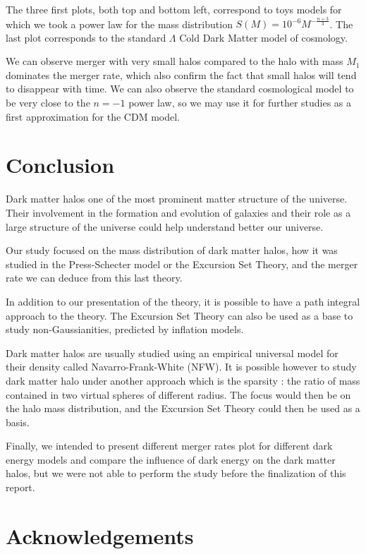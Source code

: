 The three first plots, both top and bottom left, correspond to toys models for which we took a power law for the mass distribution $S(M) = 10^{-6} M^{-\frac{n+3}{3}}$.
The last plot corresponds to the standard $\Lambda$ Cold Dark Matter model of cosmology.

We can observe merger with very small halos compared to the halo with mass $M_1$ dominates the merger rate, which also confirm the fact that small halos will tend to disappear with time.
We can also observe the standard cosmological model to be very close to the $n=-1$ power law, so we may use it for further studies as a first approximation for the CDM model.

\newpage
\section*{Conclusion}

Dark matter halos one of the most prominent matter structure of the universe. Their involvement in the formation and evolution of galaxies and their role as a large structure of the universe could help understand better our universe.

Our study focused on the mass distribution of dark matter halos, how it was studied in the Press-Schecter model or the Excursion Set Theory, and the merger rate we can deduce from this last theory.

In addition to our presentation of the theory, it is possible to have a path integral approach to the theory. The Excursion Set Theory can also be used as a base to study non-Gaussianities, predicted by inflation models.

Dark matter halos are usually studied using an empirical universal model for their density called Navarro-Frank-White (NFW). It is possible however to study dark matter halo under another approach which is the sparsity : the ratio of mass contained in two virtual spheres of different radius.
The focus would then be on the halo mass distribution, and the Excursion Set Theory could then be used as a basis.


Finally, we intended to present different merger rates plot for different dark energy models and compare the influence of dark energy on the dark matter halos, but we were not able to perform the study before the finalization of this report.


\section*{Acknowledgements}

